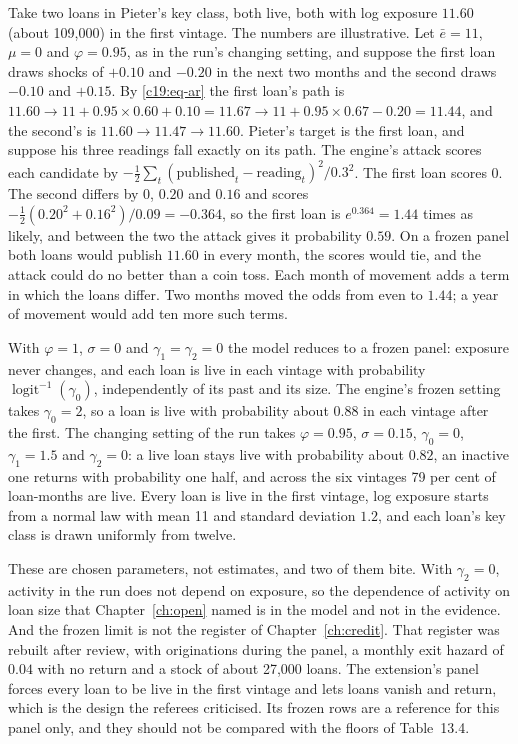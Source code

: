 \begin{example}\label{c19:ex-paths}
Take two loans in Pieter's key class, both
live, both with log exposure $11.60$ (about 109,000) in the first vintage. The numbers are
illustrative. Let $\bar e=11$, $\mu=0$ and $\varphi=0.95$, as in the run's changing setting, and suppose
the first loan draws shocks of $+0.10$ and $-0.20$ in the next two months and the second draws
$-0.10$ and $+0.15$. By \eqref{c19:eq-ar} the first loan's path is $11.60\to11+0.95\times0.60+0.10=11.67\to11+0.95\times0.67-0.20=11.44$, and the second's is $11.60\to11.47\to11.60$. Pieter's
target is the first loan, and suppose his three readings fall exactly on its path. The engine's
attack scores each candidate by $-\tfrac12\sum_t(\text{published}_t-\text{reading}_t)^2/0.3^2$. The first loan scores 0. The
second differs by 0, $0.20$ and $0.16$ and scores $-\tfrac12(0.20^2+0.16^2)/0.09=-0.364$, so the first
loan is $e^{0.364}=1.44$ times as likely, and between the two the attack gives it probability $0.59$.
On a frozen panel both loans would publish $11.60$ in every month, the scores would tie, and
the attack could do no better than a coin toss. Each month of movement adds a term in
which the loans differ. Two months moved the odds from even to $1.44$; a year of movement
would add ten more such terms.
\end{example}

With $\varphi=1$, $\sigma=0$ and $\gamma_1=\gamma_2=0$ the model reduces to a frozen panel: exposure never
changes, and each loan is live in each vintage with probability $\operatorname{logit}^{-1}(\gamma_0)$, independently
of its past and its size. The engine's frozen setting takes $\gamma_0=2$, so a loan is live with
probability about $0.88$ in each vintage after the first. The changing setting of the run takes
$\varphi=0.95$, $\sigma=0.15$, $\gamma_0=0$, $\gamma_1=1.5$ and $\gamma_2=0$: a live loan stays live with probability about
$0.82$, an inactive one returns with probability one half, and across the six vintages 79 per
cent of loan-months are live. Every loan is live in the first vintage, log exposure starts from
a normal law with mean 11 and standard deviation $1.2$, and each loan's key class is drawn
uniformly from twelve.

These are chosen parameters, not estimates, and two of them bite. With $\gamma_2=0$, activity
in the run does not depend on exposure, so the dependence of activity on loan size that
Chapter~\ref{ch:open} named is in the model and not in the evidence. And the frozen limit is not the
register of Chapter~\ref{ch:credit}. That register was rebuilt after review, with originations during the
panel, a monthly exit hazard of $0.04$ with no return and a stock of about 27,000 loans. The
extension's panel forces every loan to be live in the first vintage and lets loans vanish and
return, which is the design the referees criticised. Its frozen rows are a reference for this
panel only, and they should not be compared with the floors of Table~13.4.

